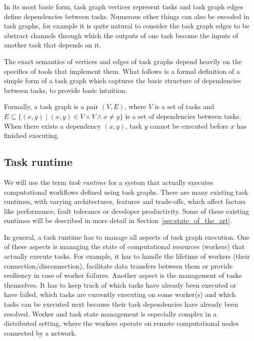 In its most basic form, task graph vertices represent tasks and task graph
edges define dependencies between tasks. Numerous other things can also be encoded in task graphs,
for example it is quite natural to consider the task graph edges to be abstract channels through
which the outputs of one task become the inputs of another task that depends on it.

The exact semantics of vertices and edges of task graphs depend heavily on the specifics of tools
that implement them. What follows is a formal definition of a simple form of a task graph which
captures the basic structure of dependencies between tasks, to provide basic intuition.

Formally, a task graph is a pair $(V, E)$, where $V$ is a set of tasks and
$E \subseteq \{(x, y) \mid (x, y) \in V\times{}V \land x \neq y \}$ is a set of dependencies
between tasks. When there exists a dependency $(x, y)$, task $y$ cannot be executed before $x$ has
finished executing.



\subsection{Task runtime}
We will use the term \emph{task runtime} for a system that actually executes
computational workflows defined using task graphs. There are many existing task runtimes,
with varying architectures, features and trade-offs, which affect factors like performance, fault
tolerance or developer productivity. Some of these existing runtimes will be described in more
detail in Section~\ref{sec:state_of_the_art}.

In general, a task runtime has to manage all aspects of task graph execution.
One of these aspects is managing the state of computational resources (workers) that actually
execute tasks. For example, it has to handle the lifetime of workers (their
connection/disconnection), facilitate data transfers between them or provide resiliency in case of
worker failures. Another aspect is the management of tasks themselves. It has to keep track of
which tasks have already been executed or have failed, which tasks are currently executing on some
worker(s) and which tasks can be executed next because their task dependencies have already been
resolved. Worker and task state management is especially complex in a distributed setting, where
the workers operate on remote computational nodes connected by a network.

